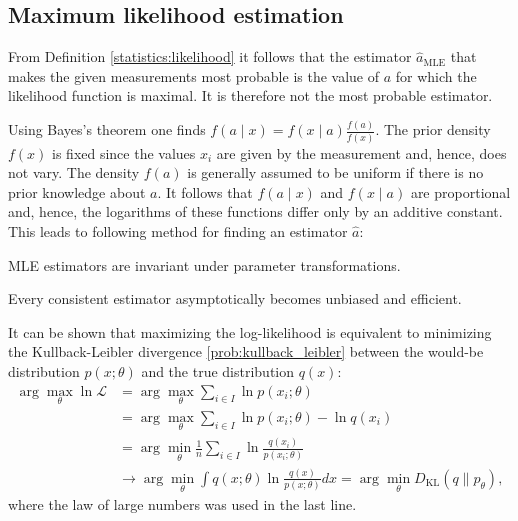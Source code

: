 {\subsection{Maximum likelihood estimation}

    From Definition \ref{statistics:likelihood} it follows that the estimator $\hat{a}_\mathrm{MLE}$ that makes the given measurements most probable is the value of $a$ for which the likelihood function is maximal. It is therefore not the most probable estimator.

    Using Bayes's theorem one finds $f(a\mid x) = f(x\mid a)\frac{f(a)}{f(x)}$. The prior density $f(x)$ is fixed since the values $x_i$ are given by the measurement and, hence, does not vary. The density $f(a)$ is generally assumed to be uniform if there is no prior knowledge about $a$. It follows that $f(a\mid x)$ and $f(x\mid a)$ are proportional and, hence, the logarithms of these functions differ only by an additive constant. This leads to following method for finding an estimator $\hat{a}$:
    \begin{property}
        MLE estimators are invariant under parameter transformations.
    \end{property}

    \begin{property}
        Every consistent estimator asymptotically becomes unbiased and efficient.
    \end{property}

    \begin{property}\label{statistics:minimizing_KL}
        It can be shown that maximizing the log-likelihood is equivalent to minimizing the Kullback-Leibler divergence \ref{prob:kullback_leibler} between the would-be distribution $p(x;\theta)$ and the true distribution $q(x)$:
        \begin{align*}
            \arg\max_\theta\ln\mathcal{L} &= \arg\max_\theta\sum_{i\in I}\ln p(x_i;\theta)\\
            &= \arg\max_\theta\sum_{i\in I}\ln p(x_i;\theta) - \ln q(x_i)\\
            &= \arg\min_\theta\frac{1}{n}\sum_{i\in I}\ln\frac{q(x_i)}{p(x_i;\theta)}\\
            &\longrightarrow\arg\min_\theta\int q(x;\theta)\ln\frac{q(x)}{p(x;\theta)}dx = \arg\min_\theta D_\mathrm{KL}(q\|p_\theta),
        \end{align*}
        where the law of large numbers was used in the last line.
    \end{property}

}
